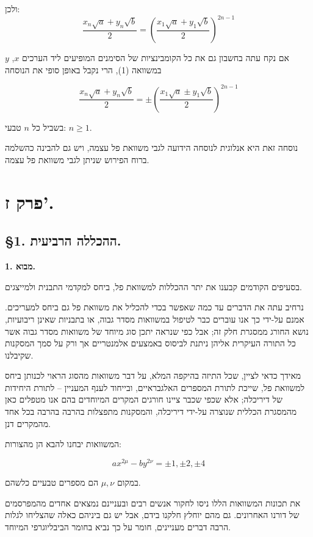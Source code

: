 ולכן:
\[ \frac{x_n\sqrt{a} + y_n\sqrt{b}}{2} = \left(\frac{x_1\sqrt{a} + y_1\sqrt{b}}{2}\right)^{2n-1} \]

אם נקח עתה בחשבון גם את כל הקומבינציות של הסימנים המופיעים ליד הערכים
$x$, $y$ במשוואה (1), הרי נקבל באופן סופי את הנוסחה

\[ \frac{x_n\sqrt{a} + y_n\sqrt{b}}{2} = \pm\left(\frac{x_1\sqrt{a} \pm y_1\sqrt{b}}{2}\right)^{2n-1} \]

בשביל כל $n$ טבעי: $n \geq 1$.

נוסחה זאת היא אנלוגית לנוסחה הידועה לגבי משוואת פל עצמה, ויש גם להבינה
כהשלמה ברוח הפירוש שניתן לגבי משוואת פל עצמה. %

\section*{פרק ז'.}

\subsection*{\S1. ההכללה הרביעית.}

\noindent\textbf{1. מבוא.}

בסעיפים הקודמים קבענו את יתר ההכללות למשוואת פל, ביחס למקדמי התבנית
ולמייצגים. %

נרחיב עתה את הדברים עד כמה שאפשר בכדי להכליל את משוואת פל גם ביחס
למעריכים. אמנם על-ידי כך אנו עוברים כבר לטיפול במשוואות מסדר גבוה, או
בתבניות שאינן ריבועיות, נושא החורג ממסגרת חלק זה; אבל כפי שנראה יתכן
סוג מיוחד של משוואות מסדר גבוה אשר כל התורה העיקרית אליהן ניתנת לביסוס
באמצעים אלמנטריים אך ורק על סמך המסקנות שקיבלנו. %

מאידך כדאי לציין, שכל התיזה בהיקפה המלא, על דבר משוואות מהסוג הראוי
לכנותן ביחס למשוואת פל, שייכת לתורת המספרים האלגבראיים, ובייחוד לענף
המעניין -- לתורת היחידות של דיריכלה; אלא שכפי שכבר ציינו חורגים המקרים
המיוחדים בהם אנו מטפלים כאן מהמסגרת הכללית שנוצרה על-ידי דיריכלה,
והמסקנות מתפצלות בהרבה בהרבה בכל אחד מהמקרים דנן. %

המשוואות יבחנו להבא הן מהצורות:

\[ ax^{2\mu} - by^{2\nu} = \pm 1 , \pm 2 , \pm 4 \]

במקום $\mu, \nu$ הם מספרים טבעיים כלשהם. %

את תכונות המשוואות הללו ניסו לחקור אנשים רבים ובעניינם נמצאים אחדים
מהמפרסמים של דורנו האחרונים. גם מהם יוחלץ חלקנו בידם, אבל יש גם ביניהם
כאלה שהצליחו לגלות הרבה דברים מעניינים, חומר על כך נביא בחומר
הביבליוגרפי המיוחד. %

